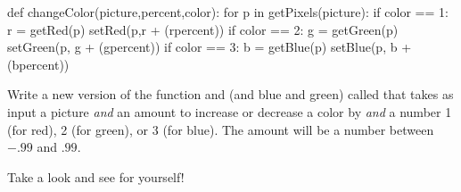 \begin{exercises}
\begin{ex}
\begin{example}
def changeColor(picture,percent,color):
    for p in getPixels(picture):
        if color == 1:
            r = getRed(p)
            setRed(p,r + (rpercent))
        if color == 2:
            g = getGreen(p)
            setGreen(p, g + (gpercent))
        if color == 3:
            b = getBlue(p)
            setBlue(p, b + (bpercent))
\end{example}

Write a new version of the function  and
 (and blue and green) called 
that takes as input a picture \emph{and} an amount to increase or
decrease a color by \emph{and} a number 1 (for red), 2 (for
green), or 3 (for blue).  The amount will be a number between
$-.99$ and $.99$.
\end{ex}

\begin{ex}
Take a look and see for yourself!
\end{ex}

\end{exercises}
